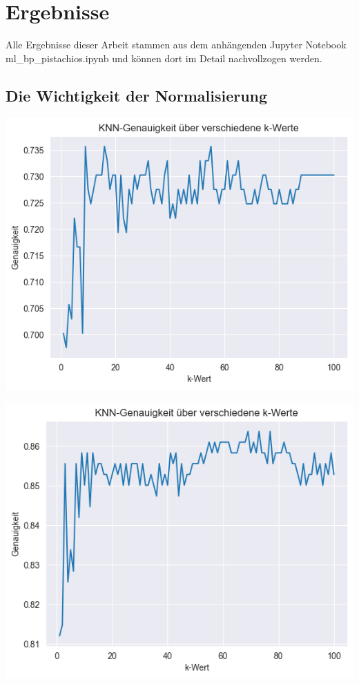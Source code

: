 \section{Ergebnisse}\label{sec:Ergebnisse}
Alle Ergebnisse dieser Arbeit stammen aus dem anhängenden Jupyter Notebook \glqq{}ml\_bp\_pistachios.ipynb\grqq{} und können dort im Detail nachvollzogen werden. 

\subsection{Die Wichtigkeit der Normalisierung}
\label{subsec:importance-of-normalizing}

{
	\centering
	\includegraphics[width=0.9\linewidth]{images/knn_all_attributes}
	\label{fig:knnallattributes}
}

{
	\centering
	\includegraphics[width=0.9\linewidth]{images/knn_normalized_all_attributes}
	\label{fig:knnnormalizedallattributes}
}

